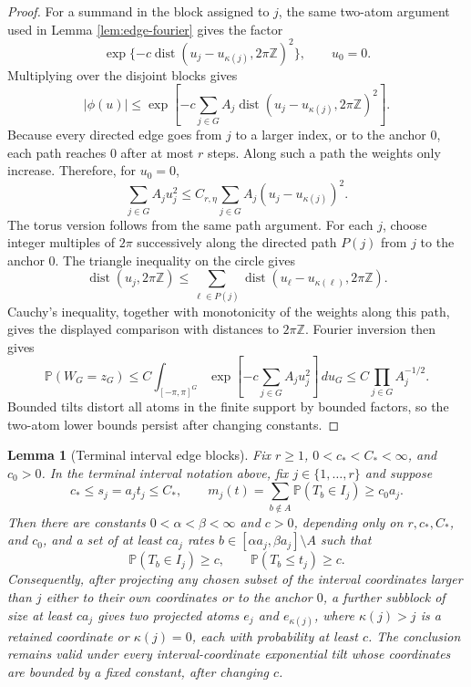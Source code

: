 \documentclass[11pt]{article}
\newtheorem{lemma}[theorem]{Lemma}
\theoremstyle{remark}
\newcommand{\Pp}{\mathbb P}
\newcommand{\dd}{\,d}
\begin{document}
\begin{proof}
For a summand in the block assigned to $j$, the same two-atom argument used
in Lemma \ref{lem:edge-fourier} gives the factor
\[
        \exp\{-c\operatorname{dist}(u_j-u_{\kappa(j)},2\pi\mathbb Z)^2\},
        \qquad u_0=0 .
\]
Multiplying over the disjoint blocks gives
\[
        |\phi(u)|\le
        \exp\left[-c\sum_{j\in G}A_j
        \operatorname{dist}(u_j-u_{\kappa(j)},2\pi\mathbb Z)^2\right].
\]
Because every directed edge goes from $j$ to a larger index, or to the
anchor $0$, each path reaches $0$ after at most $r$ steps.  Along such a
path the weights only increase.  Therefore, for $u_0=0$,
\[
        \sum_{j\in G}A_j u_j^2
        \le C_{r,\eta}\sum_{j\in G}A_j(u_j-u_{\kappa(j)})^2 .
\]
The torus version follows from the same path argument.  For each $j$, choose
integer multiples of $2\pi$ successively along the directed path $P(j)$ from
$j$ to the anchor $0$.  The triangle inequality on the circle gives
\[
        \operatorname{dist}(u_j,2\pi\mathbb Z)
        \le \sum_{\ell\in P(j)}
        \operatorname{dist}(u_\ell-u_{\kappa(\ell)},2\pi\mathbb Z).
\]
Cauchy's inequality, together with monotonicity of the weights along this path,
gives the displayed comparison with distances to $2\pi\mathbb Z$.
Fourier inversion then gives
\[
        \Pp(W_G=z_G)
        \le C\int_{[-\pi,\pi]^G}
        \exp\left[-c\sum_{j\in G}A_ju_j^2\right]\dd u_G
        \le C\prod_{j\in G}A_j^{-1/2}.
\]
Bounded tilts distort all atoms in the finite support by bounded factors, so
the two-atom lower bounds persist after changing constants.
\end{proof}

\begin{lemma}[Terminal interval edge blocks]\label{lem:terminal-interval-edge-blocks}
Fix \(r\ge1\), \(0<c_*<C_*<\infty\), and \(c_0>0\).  In the terminal
interval notation above, fix \(j\in\{1,\ldots,r\}\) and suppose
\[
        c_*\le s_j=a_jt_j\le C_*,
        \qquad
        m_j(t)=\sum_{b\notin A}\Pp(T_b\in I_j)\ge c_0a_j.
\]
Then there are constants \(0<\alpha<\beta<\infty\) and \(c>0\), depending
only on \(r,c_*,C_*\), and \(c_0\), and a set of at least \(ca_j\) rates
\(b\in[\alpha a_j,\beta a_j]\setminus A\) such that
\[
        \Pp(T_b\in I_j)\ge c,
        \qquad
        \Pp(T_b\le t_j)\ge c.
\]
Consequently, after projecting any chosen subset of the interval coordinates
larger than \(j\) either to their own coordinates or to the anchor \(0\), a
further subblock of size at least \(ca_j\) gives two projected atoms
\(e_j\) and \(e_{\kappa(j)}\), where \(\kappa(j)>j\) is a retained
coordinate or \(\kappa(j)=0\), each with probability at least \(c\).
The conclusion remains valid under every interval-coordinate exponential tilt
whose coordinates are bounded by a fixed constant, after changing \(c\).
\end{lemma}
\end{document}
